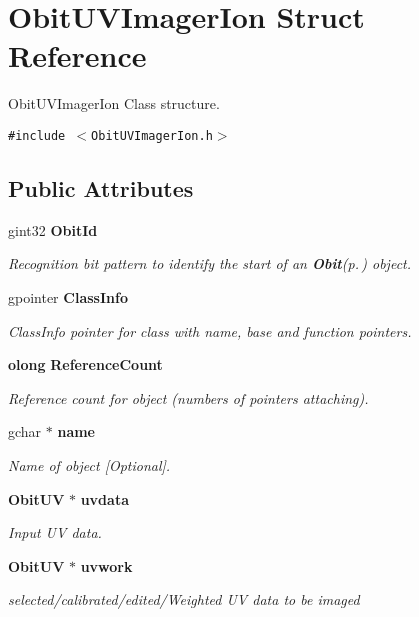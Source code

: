 \section{Obit\-UVImager\-Ion Struct Reference}
\label{structObitUVImagerIon}
Obit\-UVImager\-Ion Class structure.  


{\tt \#include $<$Obit\-UVImager\-Ion.h$>$}

\subsection*{Public Attributes}
\begin{CompactItemize}
\item 
gint32 {\bf Obit\-Id}
\begin{CompactList}\small\item\em Recognition bit pattern to identify the start of an {\bf Obit}{\rm (p.\,\pageref{structObit})} object. \item\end{CompactList}\item 
gpointer {\bf Class\-Info}
\begin{CompactList}\small\item\em Class\-Info pointer for class with name, base and function pointers. \item\end{CompactList}\item 
{\bf olong} {\bf Reference\-Count}
\begin{CompactList}\small\item\em Reference count for object (numbers of pointers attaching). \item\end{CompactList}\item 
gchar $\ast$ {\bf name}
\begin{CompactList}\small\item\em Name of object [Optional]. \item\end{CompactList}\item 
{\bf Obit\-UV} $\ast$ {\bf uvdata}
\begin{CompactList}\small\item\em Input UV data. \item\end{CompactList}\item 
{\bf Obit\-UV} $\ast$ {\bf uvwork}
\begin{CompactList}\small\item\em selected/calibrated/edited/Weighted UV data to be imaged \item\end{CompactList}\item 

\end{CompactItemize}
